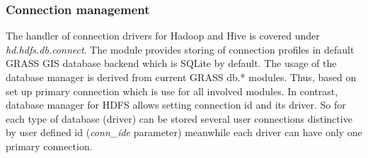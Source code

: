 \documentclass[a4paper,12pt,oneside]{report}
\begin{document}
	
	
    \subsubsection{Connection management} 
    The handler of connection drivers for Hadoop and Hive is covered under
    \textit{hd.hdfs.db.connect}. The module provides storing of connection profiles in
    default GRASS GIS database backend which is SQLite  by default. The usage of 
    the database manager is derived from current GRASS db.* modules.
    Thus, based on set up primary connection which is use for all involved modules.
    In contrast, database manager for HDFS allows setting
    connection id and its driver. So for each type of database (driver) can be
    stored several user connections distinctive by user defined id (\textit{conn\_ide}
    parameter) meanwhile  each driver can have only one primary connection.
	
\end{document}
